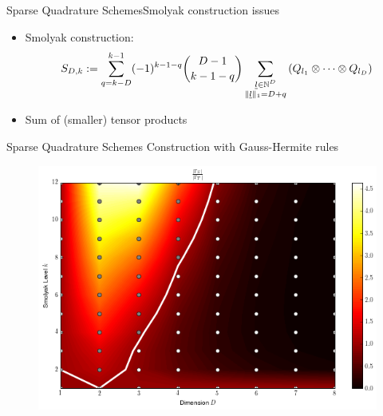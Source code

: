 \documentclass{beamer}
\begin{document}
\begin{frame}{Sparse Quadrature Schemes}{Smolyak construction issues}
  \begin{itemize}
    \item Smolyak construction:
    \begin{equation*}
      S_{D,k} := \sum_{q=k-D}^{k-1} (-1)^{k-1-q} \binom{D-1}{k-1-q}
                      \sum_{\substack{\underline{l} \in \mathbb{N}^D \\
                                      \|\underline{l}\|_1 = D+q}}
                        \left(Q_{l_1} \otimes \cdots \otimes Q_{l_D}\right)
    \end{equation*}
    \vspace{0.2cm}
    \item Sum of (smaller) tensor products
  \end{itemize}
\end{frame}


\begin{frame}{Sparse Quadrature Schemes}
  Construction with Gauss-Hermite rules
  \begin{figure}
    \centering
    \includegraphics[width=0.8\linewidth]{./fig/smolyak_gauss_ratiomap.png}
  \end{figure}
\end{frame}
\end{document}
